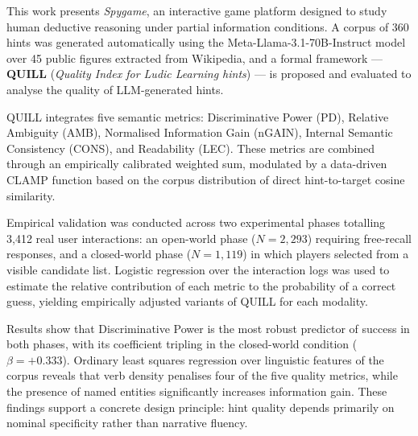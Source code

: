 \documentclass[../main.tex]{subfiles}
\begin{document}
This work presents \textit{Spygame}, an interactive game platform designed to study human deductive reasoning under partial information conditions. A corpus of 360 hints was generated automatically using the Meta-Llama-3.1-70B-Instruct model over 45 public figures extracted from Wikipedia, and a formal framework — \textbf{QUILL} (\textit{Quality Index for Ludic Learning hints}) — is proposed and evaluated to analyse the quality of LLM-generated hints.

QUILL integrates five semantic metrics: Discriminative Power (PD), Relative Ambiguity (AMB), Normalised Information Gain (nGAIN), Internal Semantic Consistency (CONS), and Readability (LEC). These metrics are combined through an empirically calibrated weighted sum, modulated by a data-driven CLAMP function based on the corpus distribution of direct hint-to-target cosine similarity.

Empirical validation was conducted across two experimental phases totalling 3,412 real user interactions: an open-world phase ($N=2{,}293$) requiring free-recall responses, and a closed-world phase ($N=1{,}119$) in which players selected from a visible candidate list. Logistic regression over the interaction logs was used to estimate the relative contribution of each metric to the probability of a correct guess, yielding empirically adjusted variants of QUILL for each modality.

Results show that Discriminative Power is the most robust predictor of success in both phases, with its coefficient tripling in the closed-world condition ($\beta=+0.333$). Ordinary least squares regression over linguistic features of the corpus reveals that verb density penalises four of the five quality metrics, while the presence of named entities significantly increases information gain. These findings support a concrete design principle: hint quality depends primarily on nominal specificity rather than narrative fluency.
\end{document}

